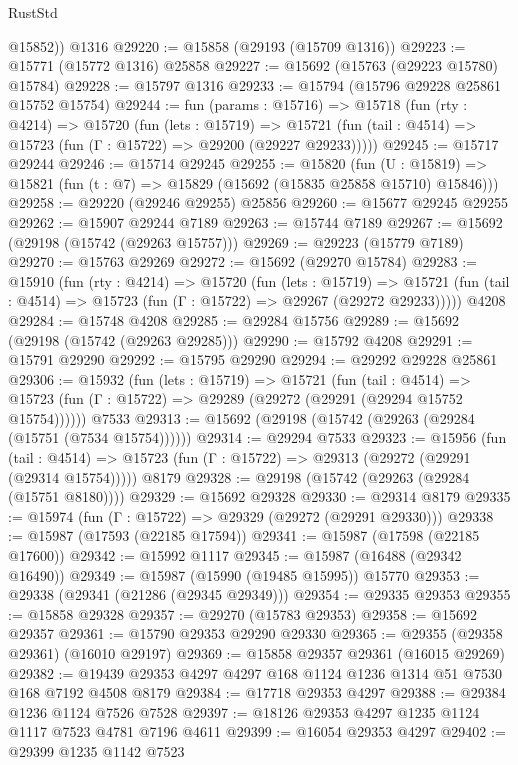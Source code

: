 \begin{lexlean}{RustStd}
\begin{coremodule}
        @15852))
    @1316
@29220 := @15858 (@29193 (@15709 @1316))
@29223 := @15771 (@15772 @1316) @25858
@29227 := @15692 (@15763 (@29223 @15780) @15784)
@29228 := @15797 @1316
@29233 := @15794 (@15796 @29228 @25861 @15752 @15754)
@29244 := fun (params : @15716) =>
  @15718
    (fun (rty : @4214) =>
    @15720
      (fun (lets : @15719) =>
      @15721 (fun (tail : @4514) => @15723 (fun (Γ : @15722) => @29200 (@29227 @29233)))))
@29245 := @15717 @29244
@29246 := @15714 @29245
@29255 := @15820
    (fun (U : @15819) => @15821 (fun (t : @7) => @15829 (@15692 (@15835 @25858 @15710) @15846)))
@29258 := @29220 (@29246 @29255) @25856
@29260 := @15677 @29245 @29255
@29262 := @15907 @29244 @7189
@29263 := @15744 @7189
@29267 := @15692 (@29198 (@15742 (@29263 @15757)))
@29269 := @29223 (@15779 @7189)
@29270 := @15763 @29269
@29272 := @15692 (@29270 @15784)
@29283 := @15910
    (fun (rty : @4214) =>
    @15720
      (fun (lets : @15719) =>
      @15721 (fun (tail : @4514) => @15723 (fun (Γ : @15722) => @29267 (@29272 @29233)))))
    @4208
@29284 := @15748 @4208
@29285 := @29284 @15756
@29289 := @15692 (@29198 (@15742 (@29263 @29285)))
@29290 := @15792 @4208
@29291 := @15791 @29290
@29292 := @15795 @29290
@29294 := @29292 @29228 @25861
@29306 := @15932
    (fun (lets : @15719) =>
    @15721
      (fun (tail : @4514) =>
      @15723 (fun (Γ : @15722) => @29289 (@29272 (@29291 (@29294 @15752 @15754))))))
    @7533
@29313 := @15692 (@29198 (@15742 (@29263 (@29284 (@15751 (@7534 @15754))))))
@29314 := @29294 @7533
@29323 := @15956
    (fun (tail : @4514) => @15723 (fun (Γ : @15722) => @29313 (@29272 (@29291 (@29314 @15754)))))
    @8179
@29328 := @29198 (@15742 (@29263 (@29284 (@15751 @8180))))
@29329 := @15692 @29328
@29330 := @29314 @8179
@29335 := @15974 (fun (Γ : @15722) => @29329 (@29272 (@29291 @29330)))
@29338 := @15987 (@17593 (@22185 @17594))
@29341 := @15987 (@17598 (@22185 @17600))
@29342 := @15992 @1117
@29345 := @15987 (@16488 (@29342 @16490))
@29349 := @15987 (@15990 (@19485 @15995)) @15770
@29353 := @29338 (@29341 (@21286 (@29345 @29349)))
@29354 := @29335 @29353
@29355 := @15858 @29328
@29357 := @29270 (@15783 @29353)
@29358 := @15692 @29357
@29361 := @15790 @29353 @29290 @29330
@29365 := @29355 (@29358 @29361) (@16010 @29197)
@29369 := @15858 @29357 @29361 (@16015 @29269)
@29382 := @19439 @29353 @4297 @4297 @168 @1124 @1236 @1314 @51 @7530 @168 @7192 @4508 @8179
@29384 := @17718 @29353 @4297
@29388 := @29384 @1236 @1124 @7526 @7528
@29397 := @18126 @29353 @4297 @1235 @1124 @1117 @7523 @4781 @7196 @4611
@29399 := @16054 @29353 @4297
@29402 := @29399 @1235 @1142 @7523

\end{coremodule}
\end{lexlean}

